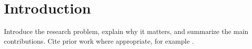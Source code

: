 \section{Introduction}
\label{sec:introduction}

Introduce the research problem, explain why it matters, and summarize the main
contributions. Cite prior work where appropriate, for example
\citet{example-reference}.
